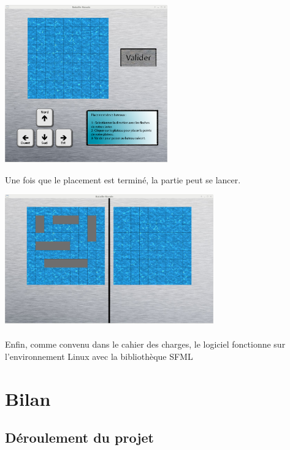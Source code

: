 \documentclass[a4paper,oneside]{article}
\begin{document}
\begin{center}
	\includegraphics[width=7cm]{menuJouer.png} 
\end{center}

Une fois que le placement est terminé, la partie peut se lancer.
	

\begin{center}
\includegraphics[width=9cm]{Jeu.png}
\end{center}



\paragraph{}
Enfin, comme convenu dans le cahier des charges, le logiciel fonctionne sur l'environnement Linux avec la bibliothèque SFML


\clearpage



\section{Bilan}


\subsection{Déroulement du projet}
\end{document}
